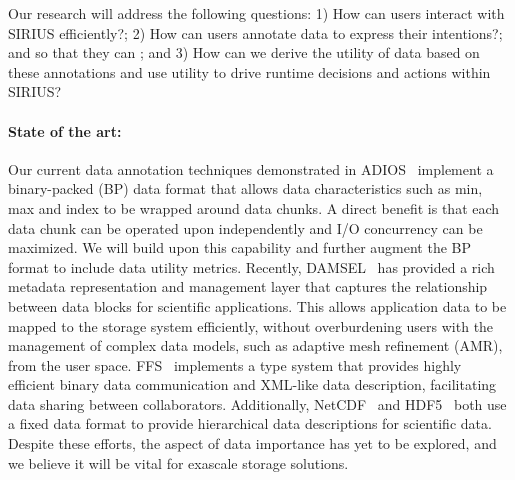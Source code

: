 


Our research will address the following questions:
1) How can users interact with SIRIUS  efficiently?;
2) How can users annotate data to express their intentions?; and  so that they can ; and
3) How can we derive the utility of data based on these annotations and use  utility to drive runtime decisions and actions within SIRIUS?

\paragraph{State of the art:}
Our current data annotation techniques demonstrated in
ADIOS~\cite{lofstead:2009:adaptible} implement a binary-packed (BP) data format that
allows data characteristics such as min, max and index to be wrapped around
data chunks. A direct benefit is that each data chunk can be operated upon
independently and I/O concurrency can be maximized. We will build upon this
capability and further augment the BP format to include data utility metrics.
Recently,
DAMSEL~\cite{damsel} has provided a rich metadata representation and management
layer that captures the relationship between data blocks for scientific
applications.  This allows application data to be mapped to the storage system
efficiently, without overburdening users with the management of complex data models, such
as adaptive mesh refinement (AMR), from the user space. 
FFS~\cite{ffs} implements a type system that provides highly efficient binary
data communication and XML-like data description, facilitating data sharing
between collaborators. Additionally, NetCDF~\cite{netcdf} and HDF5~\cite{hdf5}
both use a fixed data format to provide hierarchical data descriptions for scientific data.
Despite these efforts, the aspect of data importance has yet to be 
explored, and we believe it will be vital for exascale storage solutions.

